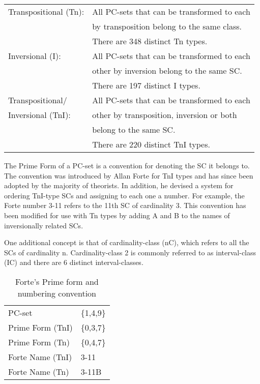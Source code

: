 \documentclass{article}
\begin{document}
\begin{center}
\begin{tabular}{ll}
 Transpositional (Tn):  &  All PC-sets that can be transformed to each  \\
                        &  by transposition belong to the same class.   \\
                        &  There are 348 distinct Tn types.             \\
 Inversional (I):       &  All PC-sets that can be transformed to each  \\
                        &  other by inversion belong to the same SC.    \\
                        &  There are 197 distinct I types.              \\
 Transpositional/       &  All PC-sets that can be transformed to each  \\
 Inversional (TnI):     &  other by transposition, inversion or both    \\
                        &  belong to the same SC.                       \\
                        &  There are 220 distinct TnI types.            \\
\end{tabular}
\end{center}



The Prime Form of a PC-set is a convention for denoting the SC it
belongs to. The convention was introduced by Allan Forte
\citep{Forte1973} for TnI types and has since been adopted by the
majority of theorists. In addition, he devised a system for ordering
TnI-type SCs and assigning to each one a number. For example, the
Forte number 3-11 refers to the 11th SC of cardinality 3. This
convention has been modified for use with Tn types by adding A and B
to the names of inversionally related SCs.

One additional concept is that of cardinality-class (nC), which refers
to all the SCs of cardinality n. Cardinality-class 2 is commonly
referred to as interval-class (IC) and there are 6 distinct
interval-classes.
\begin{table}[htb]
\caption{Forte's Prime form and numbering convention} 
\begin{center}
\begin{tabular}{ll}
 PC-set            &  \{1,4,9\}  \\
 Prime Form (TnI)  &  \{0,3,7\}  \\
 Prime Form (Tn)   &  \{0,4,7\}  \\
 Forte Name (TnI)  &  3-11       \\
 Forte Name (Tn)   &  3-11B      \\
\end{tabular}
\end{center}
\end{table}
\end{document}
